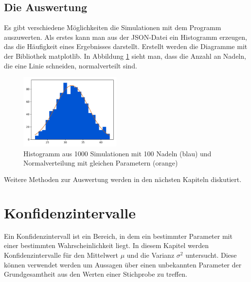 \documentclass[10pt,twocolumn]{scrartcl}
\begin{document}
	\subsection{Die Auswertung}
		Es gibt verschiedene Möglichkeiten die Simulationen mit dem Programm auszuwerten. Als erstes kann man aus der JSON-Datei ein Histogramm erzeugen, das die Häufigkeit eines Ergebnisses darstellt. Erstellt werden die Diagramme mit der Bibliothek matplotlib\cite{matplotlib}. 
		In Abbildung \ref{fig:hist} sieht man, dass die Anzahl an Nadeln, die eine Linie schneiden, normalverteilt sind.

		\begin{figure}[htb]
			\centering
			\includegraphics[width=0.45\textwidth]{images/histogram_1000_no_interval_3.png}
			\caption{Histogramm aus 1000 Simulationen mit 100 Nadeln (blau) und Normalverteilung mit gleichen Parametern (orange)}
			\label{fig:hist}
		\end{figure}
		
		Weitere Methoden zur Auswertung werden in den nächsten Kapiteln diskutiert.

\section{Konfidenzintervalle}
		Ein Konfidenzintervall ist ein Bereich, in dem ein bestimmter Parameter mit einer bestimmten Wahrscheinlichkeit liegt. In diesem Kapitel werden Konfidenzintervalle für den Mittelwert $\mu$ und die Varianz $\sigma^2$ untersucht. Diese können verwendet werden um Aussagen über einen unbekannten Parameter der Grundgesamtheit aus den Werten einer Stichprobe zu treffen.
\end{document}
